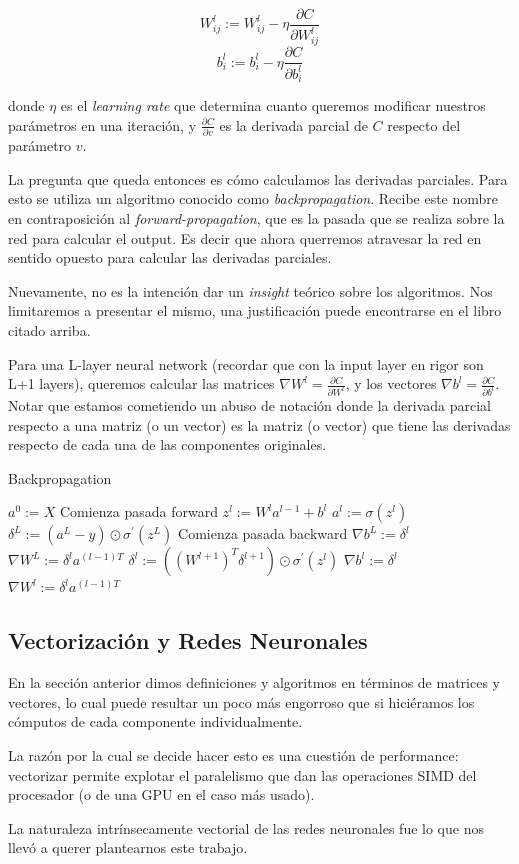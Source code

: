 $$W^l_{ij} := W^l_{ij} - \eta \frac{\partial C}{\partial W^l_{ij}}$$
$$b^l_i := b^l_i - \eta \frac{\partial C}{\partial b^l_i}$$

donde $\eta$ es el \emph{learning rate} que determina cuanto queremos modificar nuestros parámetros en una iteración, y $\frac{\partial C}{\partial v}$ es la derivada parcial de $C$ respecto del parámetro $v$.

La pregunta que queda entonces es cómo calculamos las derivadas parciales. Para esto se utiliza un algoritmo conocido como \emph{backpropagation}. Recibe este nombre en contraposición al \emph{forward-propagation}, que es la pasada que se realiza sobre la red para calcular el output. Es decir que ahora querremos atravesar la red en sentido opuesto para calcular las derivadas parciales.

Nuevamente, no es la intención dar un \emph{insight} teórico sobre los algoritmos. Nos limitaremos a presentar el mismo, una justificación puede encontrarse en el libro citado arriba.

Para una L-layer neural network (recordar que con la input layer en rigor son L+1 layers), queremos calcular las matrices $\nabla W^l = \frac{\partial C}{\partial W^l}$, y los vectores $\nabla b^l = \frac{\partial C}{\partial b^l}$. Notar que estamos cometiendo un abuso de notación donde la derivada parcial respecto a una matriz (o un vector) es la matriz (o vector) que tiene las derivadas respecto de cada una de las componentes originales.

\begin{algorithm}
\caption{Backpropagation}\label{euclid}
\begin{algorithmic}[1]
  \State $a^0 := X$
  \Comment Comienza pasada forward
    \State $z^l := W^l a^{l-1} + b^l$
    \State $a^l := \sigma(z^l)$
  \EndFor 
  \State $\delta^{L} := (a^{L} - y)\odot \sigma^\prime(z^{L})$
  \Comment Comienza pasada backward
  \State $\nabla b^L := \delta^{l}$
  \State $\nabla W^L := \delta^l a^{(l-1)T}$
    \State $\delta^{l} := ((W^{l+1})^T \delta^{l+1}) \odot \sigma^\prime(z^{l})$
    \State $\nabla b^l := \delta^{l}$
    \State $\nabla W^l := \delta^l a^{(l-1)T}$
  \EndFor
\EndProcedure
\end{algorithmic}
\end{algorithm} 

\subsection{Vectorización y Redes Neuronales}

En la sección anterior dimos definiciones y algoritmos en términos de matrices y vectores, lo cual puede resultar un poco más engorroso que si hiciéramos los cómputos de cada componente individualmente. 

La razón por la cual se decide hacer esto es una cuestión de performance: vectorizar permite explotar el paralelismo que dan las operaciones SIMD del procesador (o de una GPU en el caso más usado).

La naturaleza intrínsecamente vectorial de las redes neuronales fue lo que nos llevó a querer plantearnos este trabajo.